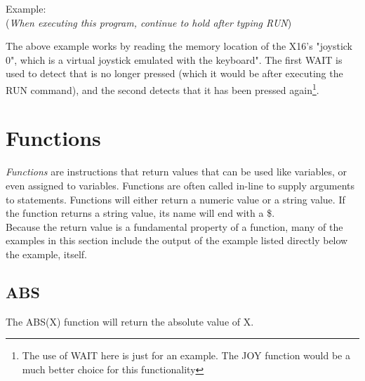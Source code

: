 Example:\\

(\emph{When executing this program, continue to hold
 after typing
{\ttfamily RUN}})\\


The above example works by reading the memory location of the X16's "joystick
0", which is a virtual joystick emulated with the keyboard".  The first
{\ttfamily WAIT} is used to detect that  is no longer pressed
(which it would be after executing the {\ttfamily RUN} command), and the second
detects that it has been pressed again\footnote{The use of {\ttfamily WAIT}
here is just for an example.  The {\ttfamily JOY} function would be a much
better choice for this functionality}.\\

\section{Functions}

\emph{Functions} are instructions that return values that can be used like
variables, or even assigned to variables.  Functions are often called in-line
to supply arguments to statements.  Functions will either return a numeric
value or a string value.  If the function returns a string value, its name will
end with a {\ttfamily \$}.\\

Because the return value is a fundamental property of a function, many of the
examples in this section include the output of the example listed directly
below the example, itself.\\

\subsection{ABS}

The {\ttfamily ABS(X)} function will return the absolute value of {\ttfamily
X}.\\

